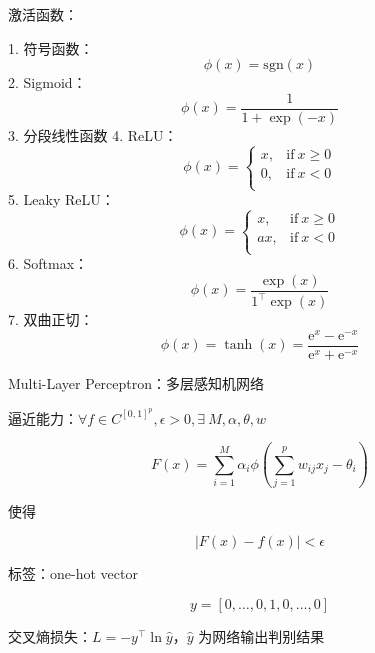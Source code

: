 \documentclass[openany,a4paper,12pt]{ctexbook}
\theoremstyle{kaiti}
\theoremstyle{normal}
\begin{document}
激活函数：

1. 符号函数：
  \begin{equation}
  \phi(x)=\mathrm{sgn}(x)
  \end{equation}
2. Sigmoid：
  \begin{equation}
  \phi(x)=\frac{1}{1+\exp(-x)}
  \end{equation}
3. 分段线性函数
4. ReLU：
  \begin{equation}
  \phi (x)=
  \begin{cases}
    x, &\mathrm{if}~x\geqslant0\\
    0, &\mathrm{if}~x<0\\
  \end{cases}
  \end{equation}
5. Leaky ReLU：
  \begin{equation}
  \phi (x)=
  \begin{cases}
    x, &\mathrm{if}~x\geqslant 0\\
    ax, &\mathrm{if}~x<0\\
  \end{cases}
  \end{equation}
6. Softmax：
  \begin{equation}
  \phi(x)=\frac{\exp(x)}{1^{\top}\exp(x)}
  \end{equation}
7. 双曲正切：
  \begin{equation}
  \phi (x)=\tanh (x)=\frac{\mathrm{e}^x-\mathrm{e}^{-x}}{\mathrm{e}^x+\mathrm{e}^{-x}}
  \end{equation}

Multi-Layer Perceptron：多层感知机网络

逼近能力：$\forall f\in C^{\left[0,1 \right] ^p}, \epsilon >0, \exists~M,\alpha ,\theta ,w$

\begin{equation}
F(x)=\sum_{i=1}^{M}\alpha_i\phi \left(\sum_{j=1}^{p}w_{ij}x_j-\theta_i \right)
\end{equation}

使得

\begin{equation}
|F(x)-f(x)|<\epsilon
\end{equation}

标签：one-hot vector

\begin{equation}
y=\left[0,\dots ,0,1,0,\dots ,0 \right]
\end{equation}

交叉熵损失：$L=-y^{\top}\ln \hat{y}$，$\hat{y}$ 为网络输出判别结果
\end{document}

